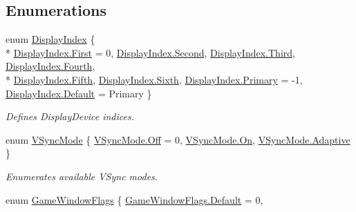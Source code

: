 \subsection*{Enumerations}
\begin{DoxyCompactItemize}
\item 
enum \hyperlink{namespace_open_t_k_a2869ea59bcff91cc6cc331f36c616389}{Display\-Index} \{ \\*
\hyperlink{namespace_open_t_k_a2869ea59bcff91cc6cc331f36c616389a7fb55ed0b7a30342ba6da306428cae04}{Display\-Index.\-First} = 0, 
\hyperlink{namespace_open_t_k_a2869ea59bcff91cc6cc331f36c616389ac22cf8376b1893dcfcef0649fe1a7d87}{Display\-Index.\-Second}, 
\hyperlink{namespace_open_t_k_a2869ea59bcff91cc6cc331f36c616389a168909c0b6f1dfbd48f679d47059c1d6}{Display\-Index.\-Third}, 
\hyperlink{namespace_open_t_k_a2869ea59bcff91cc6cc331f36c616389a6e599f7a2a9186d391be4537f105be98}{Display\-Index.\-Fourth}, 
\\*
\hyperlink{namespace_open_t_k_a2869ea59bcff91cc6cc331f36c616389a0abdfd715970bd0ef7d5574daa0e6d0b}{Display\-Index.\-Fifth}, 
\hyperlink{namespace_open_t_k_a2869ea59bcff91cc6cc331f36c616389accfb5154a8e3d8bc6fab7d8ef946d382}{Display\-Index.\-Sixth}, 
\hyperlink{namespace_open_t_k_a2869ea59bcff91cc6cc331f36c616389a074de7e7c226d5c60f8af14c20725352}{Display\-Index.\-Primary} = -\/1, 
\hyperlink{namespace_open_t_k_a2869ea59bcff91cc6cc331f36c616389a7a1920d61156abc05a60135aefe8bc67}{Display\-Index.\-Default} = Primary
 \}
\begin{DoxyCompactList}\small\item\em Defines Display\-Device indices. \end{DoxyCompactList}\item 
enum \hyperlink{namespace_open_t_k_a1c0421cc4ecbb6d5e57317906fe8b8d3}{V\-Sync\-Mode} \{ \hyperlink{namespace_open_t_k_a1c0421cc4ecbb6d5e57317906fe8b8d3ad15305d7a4e34e02489c74a5ef542f36}{V\-Sync\-Mode.\-Off} = 0, 
\hyperlink{namespace_open_t_k_a1c0421cc4ecbb6d5e57317906fe8b8d3a521c36a31c2762741cf0f8890cbe05e3}{V\-Sync\-Mode.\-On}, 
\hyperlink{namespace_open_t_k_a1c0421cc4ecbb6d5e57317906fe8b8d3a1244cba6ca79bfda45de46141d32ea7b}{V\-Sync\-Mode.\-Adaptive}
 \}
\begin{DoxyCompactList}\small\item\em Enumerates available V\-Sync modes. \end{DoxyCompactList}\item 
enum \hyperlink{namespace_open_t_k_af73dc15fc9d5b87827c81fa11b3ec6f0}{Game\-Window\-Flags} \{ \hyperlink{namespace_open_t_k_af73dc15fc9d5b87827c81fa11b3ec6f0a7a1920d61156abc05a60135aefe8bc67}{Game\-Window\-Flags.\-Default} = 0, 

\end{DoxyCompactItemize}
